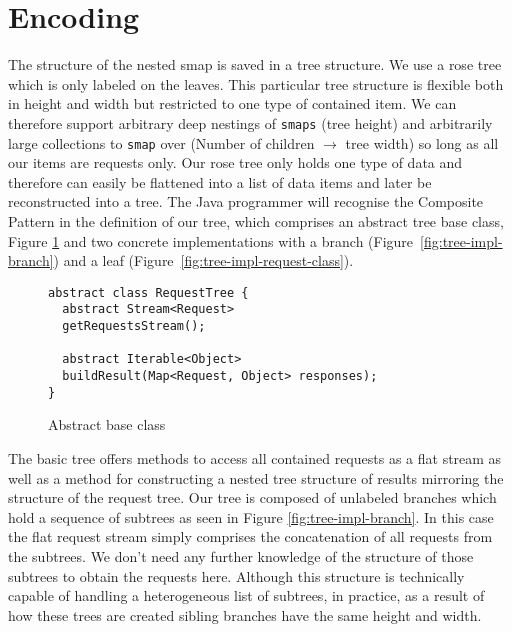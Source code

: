 \section{Encoding}

The structure of the nested smap is saved in a tree structure.
We use a rose tree\cite{MALCOLM1990255} which is only labeled on the leaves.
This particular tree structure is flexible both in height and width but restricted to one type of contained item.
We can therefore support arbitrary deep nestings of \texttt{smaps} (tree height) and arbitrarily large collections to \texttt{smap} over (Number of children $\rightarrow$ tree width) so long as all our items are requests only.
Our rose tree only holds one type of data and therefore can easily be flattened into a list of data items and later be reconstructed into a tree.
The Java programmer will recognise the Composite Pattern\cite{gamma1995design} in the definition of our tree, which comprises an abstract tree base class, Figure \ref{fig:tree-impl-base-class} and two concrete implementations with a branch (Figure~\ref{fig:tree-impl-branch}) and a leaf (Figure~\ref{fig:tree-impl-request-class}).

\begin{figure}[h]

\begin{verbatim}
abstract class RequestTree {
  abstract Stream<Request>
  getRequestsStream();

  abstract Iterable<Object>
  buildResult(Map<Request, Object> responses);
}
\end{verbatim}
\caption{Abstract base class}
\label{fig:tree-impl-base-class}

\end{figure}

The basic tree offers methods to access all contained requests as a flat stream as well as a method for constructing a nested tree structure of results mirroring the structure of the request tree.
Our tree is composed of unlabeled branches which hold a sequence of subtrees as seen in Figure \ref{fig:tree-impl-branch}.
In this case the flat request stream simply comprises the concatenation of all requests from the subtrees.
We don't need any further knowledge of the structure of those subtrees to obtain the requests here.
Although this structure is technically capable of handling a heterogeneous list of subtrees, in practice, as a result of how these trees are created sibling branches have the same height and width.

